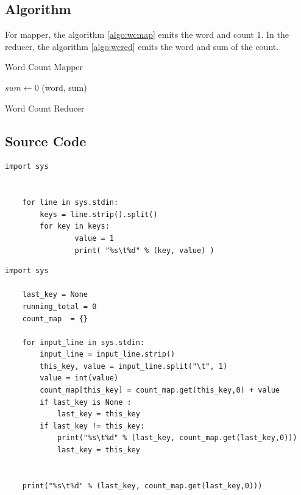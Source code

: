 \documentclass{article}
\begin{document}
\subsection{Algorithm}
For mapper, the algorithm \ref{algo:wcmap} emits the word and count 1. In the reducer, the algorithm \ref{algo:wcred} emits the word and sum of the count.
\BlankLine
\IncMargin{1em}
\begin{algorithm}
\DontPrintSemicolon
{}
\BlankLine
{}
\caption{Word Count Mapper\label{algo:wcmap}}
\end{algorithm}
\DecMargin{1em}

\IncMargin{1em}
\begin{algorithm}
\DontPrintSemicolon
{}
\BlankLine
$sum\leftarrow $0\;
\emit(word, sum)\;
\caption{Word Count Reducer\label{algo:wcred}}
\end{algorithm}
\DecMargin{1em}
\subsection{Source Code}

\begin{lstlisting}[caption={Word count mapper code},label={lst:mmmap},style=MyPythonStyle]
	import sys


	for line in sys.stdin:
		keys = line.strip().split()
		for key in keys:
	        	value = 1
	        	print( "%s\t%d" % (key, value) )

\end{lstlisting}

\begin{lstlisting}[caption={Word count reducer code},label={lst:mmmap},style=MyPythonStyle]
	import sys

	last_key = None
	running_total = 0
	count_map  = {}

	for input_line in sys.stdin:
		input_line = input_line.strip()
		this_key, value = input_line.split("\t", 1)
		value = int(value)
		count_map[this_key] = count_map.get(this_key,0) + value
		if last_key is None :
			last_key = this_key
		if last_key != this_key:
			print("%s\t%d" % (last_key, count_map.get(last_key,0)))
			last_key = this_key


	print("%s\t%d" % (last_key, count_map.get(last_key,0)))
\end{lstlisting}
\end{document}
